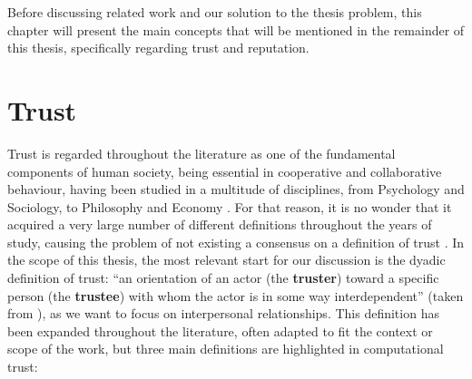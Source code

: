 \label{chap:Background}
Before discussing related work and our solution to the thesis problem, this chapter will present the main concepts that will be mentioned in the remainder of this thesis, specifically regarding trust and reputation.

\section{Trust}
\label{sec:Trust}
Trust is regarded throughout the literature as one of the fundamental components of human society, being essential in cooperative and collaborative behaviour, having been studied in a multitude of disciplines, from Psychology and Sociology, to Philosophy and Economy \cite{Rousseau1998, Jones1997, Sabater2005}. For that reason, it is no wonder that it acquired a very large number of different definitions throughout the years of study, causing the problem of not existing a consensus on a definition of trust \cite{Castelfranchi2010}. In the scope of this thesis, the most relevant start for our discussion is the dyadic definition of trust: ``an orientation of an actor (the \textbf{truster}) toward a specific person (the \textbf{trustee}) with whom the actor is in some way interdependent'' (taken from \cite{Simpson2007}), as we want to focus on interpersonal relationships. This definition has been expanded throughout the literature, often adapted to fit the context or scope of the work, but three main definitions are highlighted in computational trust:
